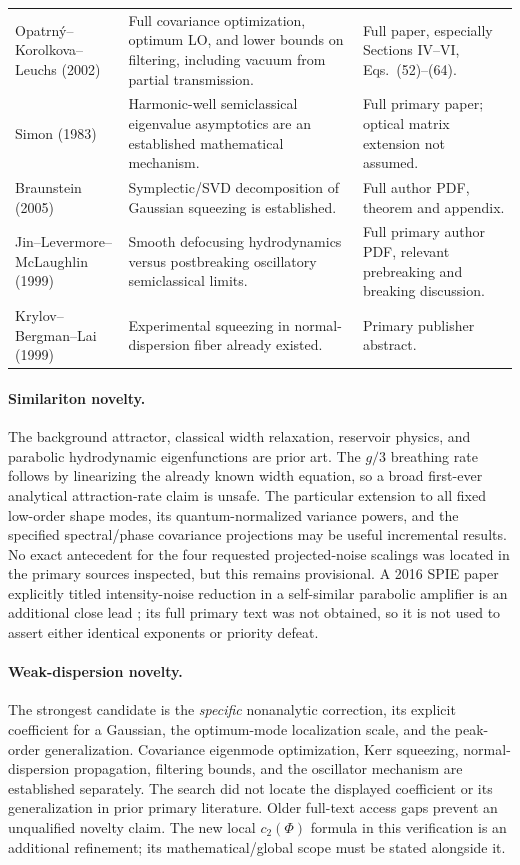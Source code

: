 \documentclass[11pt,a4paper]{article}
\begin{document}
\begin{longtable}{@{}p{}p{}p{}@{}}
Opatrn\'y--Korolkova--Leuchs (2002) \cite{opatrny} & Full covariance optimization, optimum LO, and lower bounds on filtering, including vacuum from partial transmission. & Full paper, especially Sections IV--VI, Eqs.\ (52)--(64). \\
Simon (1983) \cite{simon} & Harmonic-well semiclassical eigenvalue asymptotics are an established mathematical mechanism. & Full primary paper; optical matrix extension not assumed. \\
Braunstein (2005) \cite{braunstein} & Symplectic/SVD decomposition of Gaussian squeezing is established. & Full author PDF, theorem and appendix. \\
Jin--Levermore--McLaughlin (1999) \cite{jin} & Smooth defocusing hydrodynamics versus postbreaking oscillatory semiclassical limits. & Full primary author PDF, relevant prebreaking and breaking discussion. \\
Krylov--Bergman--Lai (1999) \cite{krylov} & Experimental squeezing in normal-dispersion fiber already existed. & Primary publisher abstract. \\
\bottomrule
\end{longtable}

\paragraph{Similariton novelty.} The background attractor, classical width relaxation, reservoir physics, and parabolic hydrodynamic eigenfunctions are prior art. The $g/3$ breathing rate follows by linearizing the already known width equation, so a broad first-ever analytical attraction-rate claim is unsafe. The particular extension to all fixed low-order shape modes, its quantum-normalized variance powers, and the specified spectral/phase covariance projections may be useful incremental results. No exact antecedent for the four requested projected-noise scalings was located in the primary sources inspected, but this remains provisional. A 2016 SPIE paper explicitly titled intensity-noise reduction in a self-similar parabolic amplifier is an additional close lead \cite{wang}; its full primary text was not obtained, so it is not used to assert either identical exponents or priority defeat.

\paragraph{Weak-dispersion novelty.} The strongest candidate is the \emph{specific} nonanalytic correction, its explicit coefficient for a Gaussian, the optimum-mode localization scale, and the peak-order generalization. Covariance eigenmode optimization, Kerr squeezing, normal-dispersion propagation, filtering bounds, and the oscillator mechanism are established separately. The search did not locate the displayed coefficient or its generalization in prior primary literature. Older full-text access gaps prevent an unqualified novelty claim. The new local $c_2(\Phi)$ formula in this verification is an additional refinement; its mathematical/global scope must be stated alongside it.
\end{document}

